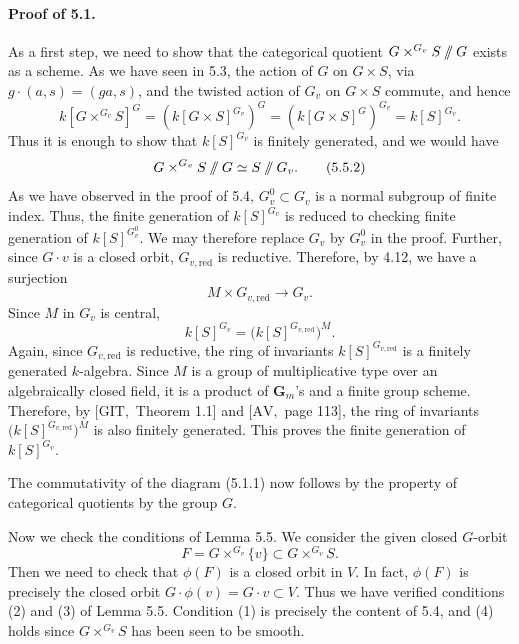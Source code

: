 \documentclass[11pt]{article}
\newcommand{\red}{\mathrm{red}}
\newcommand{\Gm}{\mathbf G_m}
\providecommand{\sslash}{\mathbin{/\mkern-6mu/}}
\begin{document}
\paragraph{Proof of 5.1.}
As a first step, we need to show that the categorical quotient
\(G\times^{G_v}S\sslash G\) exists as a scheme. As we have seen in 5.3, the action of
\(G\) on \(G\times S\), via \(g\cdot(a,s)=(ga,s)\), and the twisted action of \(G_v\)
on \(G\times S\) commute, and hence
\begin{equation}
  k[G\times^{G_v}S]^G=(k[G\times S]^{G_v})^G=(k[G\times S]^G)^{G_v}=k[S]^{G_v}.
  \tag{5.5.1}
\end{equation}
Thus it is enough to show that \(k[S]^{G_v}\) is finitely generated, and we would have
\begin{equation}
  G\times^{G_v}S\sslash G\simeq S\sslash G_v.
  \tag{5.5.2}
\end{equation}
As we have observed in the proof of 5.4, \(G_v^0\subset G_v\) is a normal subgroup of
finite index. Thus, the finite generation of \(k[S]^{G_v}\) is reduced to checking finite
generation of \(k[S]^{G_v^0}\). We may therefore replace \(G_v\) by \(G_v^0\) in the
proof. Further, since \(G\cdot v\) is a closed orbit, \(G_{v,\red}\) is reductive.
Therefore, by 4.12, we have a surjection
\[
  M\times G_{v,\red}\longrightarrow G_v.
\]
Since \(M\) in \(G_v\) is central,
\[
  k[S]^{G_v}=\bigl(k[S]^{G_{v,\red}}\bigr)^M.
\]
Again, since \(G_{v,\red}\) is reductive, the ring of invariants
\(k[S]^{G_{v,\red}}\) is a finitely generated \(k\)-algebra. Since \(M\) is a group of
multiplicative type over an algebraically closed field, it is a product of \(\Gm\)'s and a
finite group scheme. Therefore, by \([\mathrm{GIT},\) Theorem 1.1] and \([\mathrm{AV},\)
page 113], the ring of invariants \(\bigl(k[S]^{G_{v,\red}}\bigr)^M\) is also finitely
generated. This proves the finite generation of \(k[S]^{G_v}\).

The commutativity of the diagram (5.1.1) now follows by the property of categorical
quotients by the group \(G\).

Now we check the conditions of Lemma 5.5. We consider the given closed \(G\)-orbit
\[
  F=G\times^{G_v}\{v\}\subset G\times^{G_v}S.
\]
Then we need to check that \(\phi(F)\) is a closed orbit in \(V\). In fact, \(\phi(F)\)
is precisely the closed orbit \(G\cdot\phi(v)=G\cdot v\subset V\). Thus we have verified
conditions (2) and (3) of Lemma 5.5. Condition (1) is precisely the content of 5.4, and
(4) holds since \(G\times^{G_v}S\) has been seen to be smooth.
\end{document}
